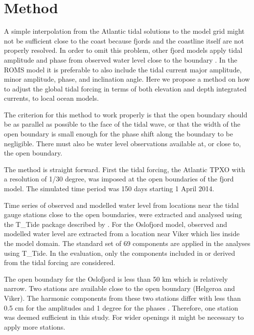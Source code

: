 \section{Method}

A simple interpolation from the Atlantic tidal solutions to the model grid might not be sufficient close to the coast because fjords and the coastline itself are not properly resolved. In order to omit this problem, other fjord models apply tidal amplitude and phase from observed water level close to the boundary \cite[i.e.]{foreman90,svendsen96,lynge13}. In the ROMS model it is preferable to also include the tidal current major amplitude, minor amplitude, phase, and inclination angle. Here we propose a method on how to adjust the global tidal forcing in terms of both elevation and depth integrated currents, to local ocean models. 

The criterion for this method to work properly is that the open boundary should be as parallel as possible to the face of the tidal wave, or that the width of the open boundary is small enough for the phase shift along the boundary to be negligible. There must also be water level observations available at, or close to, the open boundary.

The method is straight forward. First the tidal forcing, the Atlantic TPXO with a resolution of 1/30 degree, was imposed at the open boundaries of the fjord model. The simulated time period was 150 days starting 1 April 2014. 

Time series of observed and modelled water level from locations near the tidal gauge stations close to the open boundaries, were extracted and analysed using the T\_Tide package described by \cite{pawlowicz02}. For the Oslofjord model, observed and modelled water level are extracted from a location near Viker which lies inside the model domain. 
The standard set of 69 components are applied in the analyses using T\_Tide. In the evaluation, only the components included in or derived from the tidal forcing are considered. 

The open boundary for the Oslofjord is less than 50 km which is relatively narrow. Two stations are available close to the open boundary (Helgeroa and Viker). The harmonic components from these two stations differ with less than 0.5 cm for the amplitudes and 1 degree for the phases \cite[]{tide16}. Therefore, one station was deemed sufficient in this study. For wider openings it might be necessary to apply more stations. 

